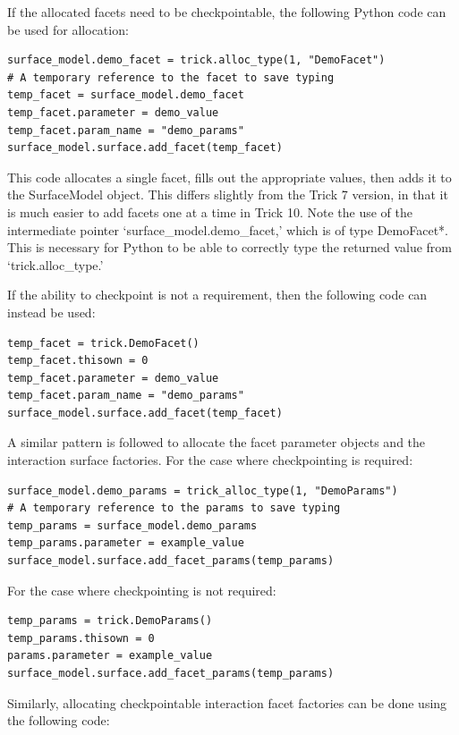 If the allocated facets need to be checkpointable, the following Python code can be used for allocation:

\begin{verbatim}
surface_model.demo_facet = trick.alloc_type(1, "DemoFacet")
# A temporary reference to the facet to save typing
temp_facet = surface_model.demo_facet
temp_facet.parameter = demo_value
temp_facet.param_name = "demo_params"
surface_model.surface.add_facet(temp_facet)
\end{verbatim}

This code allocates a single facet, fills out
the appropriate values, then adds it to the SurfaceModel
object. This differs slightly from the Trick 7 version, in that
it is much easier to add facets one at a time in Trick 10.
Note the use of the intermediate pointer `surface\_model.demo\_facet,'
which is of type DemoFacet*. This is necessary
for Python to be able to correctly type the returned value from `trick.alloc\_type.'

If the ability to checkpoint is not a requirement, then the following code
can instead be used:

\begin{verbatim}
temp_facet = trick.DemoFacet()
temp_facet.thisown = 0
temp_facet.parameter = demo_value
temp_facet.param_name = "demo_params"
surface_model.surface.add_facet(temp_facet)
\end{verbatim}

A similar pattern is followed to allocate the facet parameter objects and 
the interaction surface factories. For the case where checkpointing is required:

\begin{verbatim}
surface_model.demo_params = trick_alloc_type(1, "DemoParams")
# A temporary reference to the params to save typing
temp_params = surface_model.demo_params
temp_params.parameter = example_value
surface_model.surface.add_facet_params(temp_params)
\end{verbatim}

For the case where checkpointing is not required:

\begin{verbatim}
temp_params = trick.DemoParams()
temp_params.thisown = 0
params.parameter = example_value
surface_model.surface.add_facet_params(temp_params)
\end{verbatim}

Similarly, allocating checkpointable interaction facet factories can be
done using the following code:

